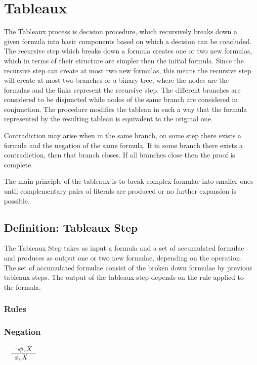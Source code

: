 \documentclass{article}
\begin{document}
	\section{Tableaux}
	The Tableaux process is decision procedure, which recursively breaks down a given formula into basic components 
	based on which a decision can be concluded. The recursive step which breaks down a formula creates one or two 
	new formulas, which in terms of their structure are simpler then the initial formula. Since the recursive step can create
	at most two new formulas, this means the recursive step will create at most two branches or a binary tree, where the nodes
	are the formulas and the links represent the recursive step. The different branches are considered to be disjuncted while
   	nodes of the same branch are considered in conjunction. The procedure modifies the tableau in such a way that the 
	formula represented by the resulting tableau is equivalent to the original one.

	Contradiction may arise when in the same branch, on some step there exists a formula and the negation of the same formula.
	If in some branch there exists a contradiction, then that branch closes. If all branches close then the proof is complete.
	
	The main principle of the tableaux is to break complex formulae into smaller ones until complementary pairs of literals are
	produced or no further expansion is possible.

	\subsection{Definition: Tableaux Step}
		The Tableaux Step takes as input a formula and a set of accumulated formulae and produces as 
		output one or two new formulae, depending on the operation. 
		The set of accumulated formulae consist of the broken down formulae by previous tableaux steps.
		The output of the tableaux step depends on the rule applied to the formula.

		\subsubsection{Rules}
		\subsubsection*{Negation}
			$\begin{array}{rl}
				& \neg \phi, X \\
			      \cline{2-2}
			      & \phi, X
			\end{array}$
\end{document}
